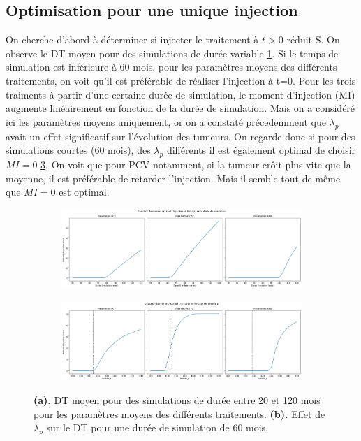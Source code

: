 \documentclass[12pt,a4paper]{article}
\begin{document}
\subsection{Optimisation pour une unique injection}
On cherche d'abord à déterminer si injecter le traitement à $ t > 0$  réduit S.  On observe le DT moyen pour des simulations de durée variable \ref{fig:duree_simu}. Si le temps de simulation est inférieure à 60 mois, pour les paramètres moyens des différents traitements, on voit qu'il est préférable de réaliser l'injection à t=0.  Pour les trois traiments à partir d'une certaine durée de simulation, le moment d'injection (MI) augmente linéairement en fonction de la durée de simulation. Mais on a considéré ici les paramètres moyens uniquement, or on a constaté précedemment que $\lambda_{p}$ avait un effet significatif sur l'évolution des tumeurs. On regarde donc si pour des simulations courtes (60 mois), des $\lambda_{p}$ différents il est également optimal de choisir $MI = 0$ \ref{fig:effet_lambda_moment}. On voit que pour PCV notamment, si la tumeur crôit plus vite que la moyenne, il est préférable de retarder l'injection. Mais il semble tout de même que $MI = 0$ est optimal.
\begin{figure}

    \centering
    \begin{subfigure}[t]{\textwidth}
        \centering
        \includegraphics[width=\textwidth]{Image/duree_simu.png} 
        \caption{} \label{fig:duree_simu}
    \end{subfigure}

    \vspace{0.5cm}

    \begin{subfigure}[t]{\textwidth}
        \centering
        \includegraphics[width=\textwidth]{Image/effet_lambda_moment.png}
        \caption{} \label{fig:effet_lambda_moment}
    \end{subfigure}

    \caption{\textbf{(a).} DT moyen pour des simulations de durée entre 20 et 120 mois pour les paramètres moyens des différents traitements. \textbf{(b).} Effet de $\lambda_{p}$ sur le DT pour une durée de simulation de 60 mois.}
\end{figure}
\end{document}
